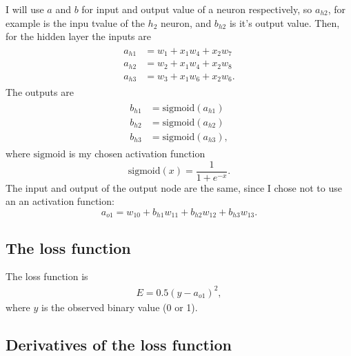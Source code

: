 I will use $a$ and $b$ for input and output value of a neuron respectively, so $a_{h2}$, for example is the inpu tvalue of the $h_2$ neuron, and $b_{h2}$ is it's output value. Then, for the hidden layer the inputs are
\begin{align}
  \label{eq_q1_hidden_neurons_inputs}
  \begin{split}
    a_{h1} &= w_1 + x_1 w_4 + x_2 w_7 \\
    a_{h2} &= w_2 + x_1 w_4 + x_2 w_8 \\
    a_{h3} &= w_3 + x_1 w_6 + x_2 w_6.
  \end{split}
\end{align}
The outputs are
\begin{align}
  \label{eq_q1_hidden_neurons_outputs}
  \begin{split}
    b_{h1} &= \text{sigmoid}(a_{h1}) \\
    b_{h2} &= \text{sigmoid}(a_{h2}) \\
    b_{h3} &= \text{sigmoid}(a_{h3}),
  \end{split}
\end{align}
where $\text{sigmoid}$ is my chosen activation function
\[
\text{sigmoid}(x) = \frac{1}{1 + e^{-x}}.
\]
The input and output of the output node are the same, since I chose not to use an an activation function:
\begin{equation}
  a_{o1} = w_{10} + b_{h1} w_{11} + b_{h2} w_{12} + b_{h3} w_{13}.
  \label{eq_q1_output_value}
\end{equation}


\subsection{The loss function}

The loss function is
\begin{align}
  E = 0.5 (y - a_{o1})^2,
  \label{eq_q1_loss_function}
\end{align}
where $y$ is the observed binary value (0 or 1).


\subsection{Derivatives of the loss function}

